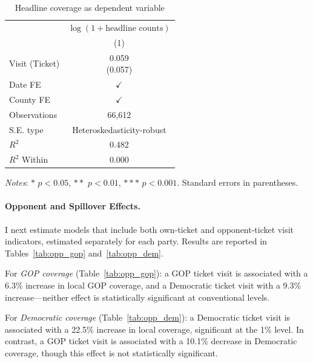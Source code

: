 \documentclass{article}
\begin{document}
\begin{table}[H]
\centering
\caption{Headline coverage as dependent variable}
\label{tab:headline}
\renewcommand\cellalign{t}
\begin{threeparttable}
\begin{tabular}{lc}
\toprule
 & $\log(1+\text{headline counts})$ \\
 & (1) \\
\midrule
\addlinespace
Visit (Ticket) & \makecell{0.059 \\ (0.057)} \\
\midrule
\addlinespace
Date FE        & $\checkmark$ \\
County FE      & $\checkmark$ \\
\midrule
\addlinespace
Observations   & 66,612 \\
S.E. type      & Heteroskedasticity-robust \\
$R^2$          & 0.482 \\
$R^2$ Within   & 0.000 \\
\bottomrule
\end{tabular}
\begin{tablenotes}
\footnotesize
\item \textit{Notes}: $*$ $p<0.05$, $**$ $p<0.01$, $***$ $p<0.001$.
      Standard errors in parentheses.
\end{tablenotes}
\end{threeparttable}
\end{table}

\paragraph{Opponent and Spillover Effects.}
I next estimate models that include both own-ticket and opponent-ticket visit indicators,
estimated separately for each party.
Results are reported in Tables~\ref{tab:opp_gop} and~\ref{tab:opp_dem}.

For \textit{GOP coverage} (Table~\ref{tab:opp_gop}): a GOP ticket visit is associated with
a 6.3\% increase in local GOP coverage, and a Democratic ticket visit with a 9.3\%
increase---neither effect is statistically significant at conventional levels.

For \textit{Democratic coverage} (Table~\ref{tab:opp_dem}): a Democratic ticket visit is
associated with a 22.5\% increase in local coverage, significant at the 1\% level.
In contrast, a GOP ticket visit is associated with a 10.1\% decrease in Democratic
coverage, though this effect is not statistically significant.
\end{document}
